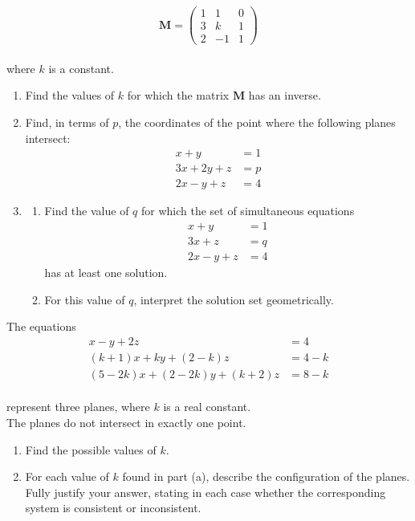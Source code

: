\documentclass[leqno]{article}
\begin{document}
\begin{enumerate}[
  label=\textbf{\arabic*.},
  leftmargin=*,
  topsep=0pt,
  partopsep=0pt,
  parsep=0pt
]
\[
\mathbf{M}=\begin{pmatrix}
1&1&0\\
3&k&1\\
2&-1&1
\end{pmatrix}
\] \\
where $k$ is a constant. \\
\begin{enumerate}[label=\textbf{(\alph*)}]
  \item Find the values of $k$ for which the matrix $\mathbf{M}$ has an inverse.  \\
  \item Find, in terms of $p$, the coordinates of the point where the following planes intersect:
  \[
  \begin{aligned}
  x+y&=1\\
  3x+2y+z&=p\\
  2x-y+z&=4
  \end{aligned}
  \]
  \item
  \begin{enumerate}[label=(\roman*)]
    \item Find the value of $q$ for which the set of simultaneous equations
    \[
    \begin{aligned}
    x+y&=1\\
    3x+z&=q\\
    2x-y+z&=4
    \end{aligned}
    \]
    has at least one solution. 
    \item For this value of $q$, interpret the solution set geometrically.  \\
  \end{enumerate}
\end{enumerate}

\newpage

\questionitem

The equations
\[
\begin{aligned}
x-y+2z&=4\\
(k+1)x+ky+(2-k)z&=4-k\\
(5-2k)x+(2-2k)y+(k+2)z&=8-k
\end{aligned}
\] \\
represent three planes, where $k$ is a real constant. \\
The planes do not intersect in exactly one point. \\
\begin{enumerate}[label=\textbf{(\alph*)}]
  \item Find the possible values of $k$.  \\
  \item For each value of $k$ found in part (a), describe the configuration of the planes. \\
  Fully justify your answer, stating in each case whether the corresponding system is consistent or inconsistent.  \\
\end{enumerate}


\end{enumerate}
\end{document}
